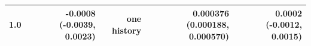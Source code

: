 \begin{tabular}{rrrrr}
1.0 & -0.0008 (-0.0039, 0.0023) & one history & 0.000376 (0.000188, 0.000570) & 0.0002 (-0.0012, 0.0015) \\
\bottomrule
\end{tabular}
